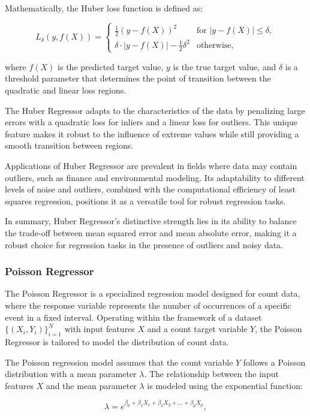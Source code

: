 \documentclass[twocolumn]{article}
\begin{document}
Mathematically, the Huber loss function is defined as:

\[ L_{\delta}(y, f(X)) = \begin{cases} 
\frac{1}{2}(y - f(X))^2 & \text{for } |y - f(X)| \leq \delta, \\
\delta \cdot |y - f(X)| - \frac{1}{2}\delta^2 & \text{otherwise,}
\end{cases} \]

where \(f(X)\) is the predicted target value, \(y\) is the true target value, and \(\delta\) is a threshold parameter that determines the point of transition between the quadratic and linear loss regions.

The Huber Regressor adapts to the characteristics of the data by penalizing large errors with a quadratic loss for inliers and a linear loss for outliers. This unique feature makes it robust to the influence of extreme values while still providing a smooth transition between regions.

Applications of Huber Regressor are prevalent in fields where data may contain outliers, such as finance and environmental modeling. Its adaptability to different levels of noise and outliers, combined with the computational efficiency of least squares regression, positions it as a versatile tool for robust regression tasks.

In summary, Huber Regressor's distinctive strength lies in its ability to balance the trade-off between mean squared error and mean absolute error, making it a robust choice for regression tasks in the presence of outliers and noisy data.

		\subsubsection{Poisson Regressor}
The Poisson Regressor is a specialized regression model designed for count data, where the response variable represents the number of occurrences of a specific event in a fixed interval. Operating within the framework of a dataset \(\{(X_i, Y_i)\}_{i=1}^{N}\) with input features \(X\) and a count target variable \(Y\), the Poisson Regressor is tailored to model the distribution of count data.

The Poisson regression model assumes that the count variable \(Y\) follows a Poisson distribution with a mean parameter \(\lambda\). The relationship between the input features \(X\) and the mean parameter \(\lambda\) is modeled using the exponential function:

\[ \lambda = e^{\beta_0 + \beta_1 X_1 + \beta_2 X_2 + \ldots + \beta_p X_p}, \]
\end{document}
